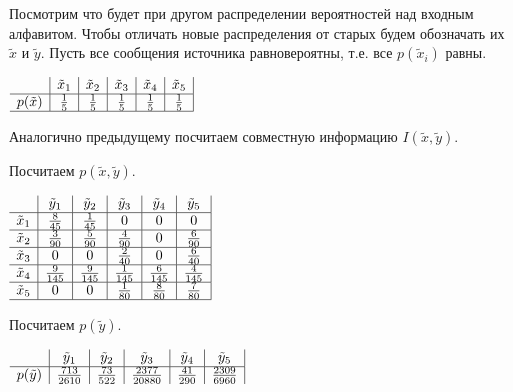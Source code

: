 \documentclass[a4paper,12pt]{article}
\begin{document}
Посмотрим что будет при другом распределении вероятностей над входным алфавитом. Чтобы отличать новые распределения от старых будем обозначать их $\tilde{x}$ и $\tilde{y}$.
Пусть все сообщения источника равновероятны, т.е. все $p(\tilde{x}_i)$ равны.

\begin{table}[h]
$\begin{array}{c *{5}{|c} |}
& \tilde{x}_1 & \tilde{x}_2 & \tilde{x}_3 & \tilde{x}_4 & \tilde{x}_5 \\ \hline
p(\tilde{x}) & \frac{1}{5} & \frac{1}{5} & \frac{1}{5} & \frac{1}{5} & \frac{1}{5} \\ \hline
\end{array}$
\caption{$p(\tilde{x})$}
\end{table}

Аналогично предыдущему посчитаем совместную информацию $I(\tilde{x}, \tilde{y})$.

Посчитаем $p(\tilde{x}, \tilde{y})$.

\begin{table}[h]
$\begin{array}{c *{5}{|c} |}
& \tilde{y}_1 & \tilde{y}_2 & \tilde{y}_3 & \tilde{y}_4 & \tilde{y}_5 \\ \hline
\tilde{x}_1 & \frac{8}{45} & \frac{1}{45} & 0 & 0 & 0 \\ \hline
\tilde{x}_2 & \frac{3}{90} & \frac{5}{90} & \frac{4}{90} & 0 & \frac{6}{90} \\ \hline
\tilde{x}_3 & 0 & 0 & \frac{2}{40} & 0 & \frac{6}{40} \\ \hline
\tilde{x}_4 & \frac{9}{145} & \frac{9}{145} & \frac{1}{145} & \frac{6}{145} & \frac{4}{145} \\ \hline
\tilde{x}_5 & 0 & 0 & \frac{1}{80} & \frac{8}{80} & \frac{7}{80} \\ \hline
\end{array}$
\caption{$p(\tilde{x}, \tilde{y})$}
\end{table}

Посчитаем $p(\tilde{y})$.

\begin{table}[h]
$\begin{array}{c *{5}{|c} |}
& \tilde{y}_1 & \tilde{y}_2 & \tilde{y}_3 & \tilde{y}_4 & \tilde{y}_5 \\ \hline
p(\tilde{y}) & \frac{713}{2610} & \frac{73}{522} & \frac{2377}{20880} & \frac{41}{290} & \frac{2309}{6960}
\end{array}$
\caption{$p(\tilde{y})$}
\end{table}
\end{document}
